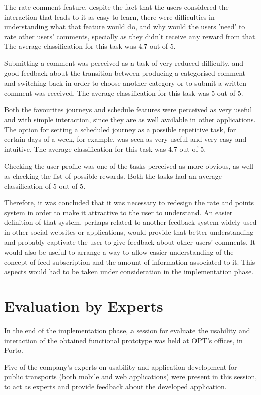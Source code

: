 The rate comment feature, despite the fact that the users considered the interaction that leads to it as easy to learn, there were difficulties in understanding what that feature would do, and why would the users 'need' to rate other users' comments, specially as they didn't receive any reward from that. The average classification for this task was 4.7 out of 5.

Submitting a comment was perceived as a task of very reduced difficulty, and good feedback about the transition between producing a categorised comment and switching back in order to choose another category or to submit a written comment was received. The average classification for this task was 5 out of 5.

Both the favourites journeys and schedule features were perceived as very useful and with simple interaction, since they are as well available in other applications. The option for setting a scheduled journey as a possible repetitive task, for certain days of a week, for example, was seen as very useful and very easy and intuitive. 
The average classification for this task was 4.7 out of 5.

Checking the user profile was one of the tasks perceived as more obvious, as well as checking the list of possible rewards. Both the 
tasks had an average classification of 5 out of 5.

Therefore, it was concluded that it was necessary to redesign the rate and points system in order to make it attractive to the user to understand. An easier definition of that system, perhaps related to another feedback system widely used in other social websites or applications, would provide that better understanding and probably captivate the user to give feedback about other users' comments. It would also be useful to arrange a way to allow easier understanding of the concept of feed subscription and the amount of information associated to it. This aspects would had to be taken under consideration in the implementation phase.

\section{Evaluation by Experts}

In the end of the implementation phase, a session for evaluate the usability and interaction of the obtained functional prototype was held at OPT's offices, in Porto. 

Five of the company's experts on usability and application development for public transports (both mobile and web applications) were present in this session, to act as experts and provide feedback about the developed application.


